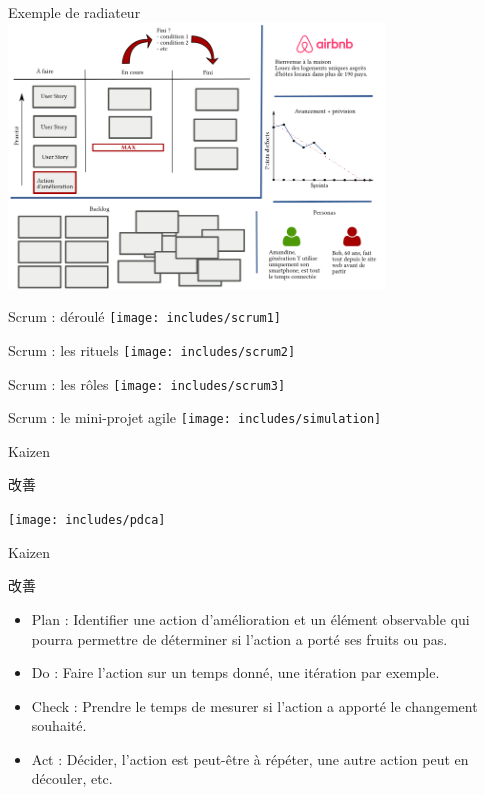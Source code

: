\documentclass{beamer}
\begin{document}
\begin{frame}{Exemple de radiateur}
  \center
  \includegraphics[width=10cm]{includes/radiateur}
\end{frame}

\begin{frame}{Scrum : déroulé}
  \center
  \texttt{[image: includes/scrum1]}
\end{frame}

\begin{frame}{Scrum : les rituels}
  \center
  \texttt{[image: includes/scrum2]}
\end{frame}

\begin{frame}{Scrum : les rôles}
  \center
  \texttt{[image: includes/scrum3]}
\end{frame}

\begin{frame}{Scrum : le mini-projet agile}
  \center
  \texttt{[image: includes/simulation]}
\end{frame}

\begin{frame}{Kaizen 
    {\begin{CJK*}{UTF8}{mj} 改善 \end{CJK*}}
  }
  \center
  \texttt{[image: includes/pdca]}
\end{frame}

\begin{frame}{Kaizen 
    {\begin{CJK*}{UTF8}{mj} 改善 \end{CJK*}}
  }
  
  \begin{itemize}
    \item \alert{Plan} : Identifier une action d'amélioration et un élément observable qui pourra permettre de déterminer si l'action a porté ses fruits ou pas.
    \item \alert{Do} : Faire l'action sur un temps donné, une itération par exemple.
    \item \alert{Check} : Prendre le temps de mesurer si l'action a apporté le changement souhaité.
    \item \alert{Act} : Décider, l'action est peut-être à répéter, une autre action peut en découler, etc.
  \end{itemize}

\end{frame}
\end{document}

